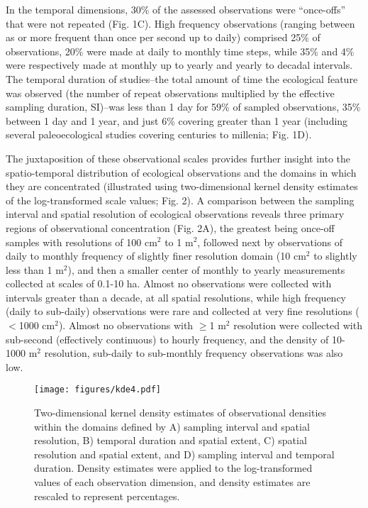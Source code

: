\documentclass[12pt]{article}
\begin{document}
In the temporal dimensions, 30\% of the assessed observations were ``once-offs'' that were not repeated (Fig. 1C). High frequency observations (ranging between as or more frequent than once per second up to daily) comprised 25\% of observations, 20\% were made at daily to monthly time steps, while 35\% and 4\% were respectively made at monthly up to yearly and yearly to decadal intervals.  The temporal duration of studies--the total amount of time the ecological feature was observed (the number of repeat observations multiplied by the effective sampling duration, SI)--was less than 1 day for 59\% of sampled observations,  35\% between 1 day and 1 year, and just 6\% covering greater than 1 year (including several paleoecological studies covering centuries to millenia; Fig. 1D).

The juxtaposition of these observational scales provides further insight into the spatio-temporal distribution of ecological observations and the domains in which they are concentrated (illustrated using two-dimensional kernel density estimates of the log-transformed scale values; Fig. 2). A comparison between the sampling interval and spatial resolution of ecological observations reveals three primary regions of observational concentration (Fig. 2A), the greatest being once-off samples with resolutions of 100 cm$^2$ to 1 m$^2$, followed next by observations of daily to monthly frequency of slightly finer resolution domain (10 cm$^2$ to slightly less than 1 m$^2$), and then a smaller center of monthly to yearly measurements collected at scales of 0.1-10 ha.  Almost no observations were collected with intervals greater than a decade, at all spatial resolutions, while high frequency (daily to sub-daily) observations were rare and collected at very fine resolutions ($<$1000 cm$^2$). Almost no observations with $\geq$1 m$^2$ resolution were collected with sub-second (effectively continuous) to hourly frequency, and the density of 10-1000 m$^2$ resolution, sub-daily to sub-monthly frequency observations was also low. 

\begin{figure}[!ht]
\texttt{[image: figures/kde4.pdf]}
\vspace{-0.15 cm}
\caption{Two-dimensional kernel density estimates of observational densities within the domains defined by A) sampling interval and spatial resolution, B) temporal duration and spatial extent, C) spatial resolution and spatial extent, and D) sampling interval and temporal duration. Density estimates were applied to the log-transformed values of each observation dimension, and density estimates are rescaled to represent percentages. }
\label{afoto1}
\end{figure}
\end{document}
